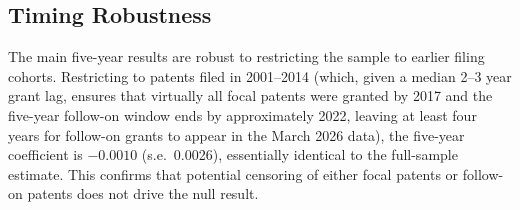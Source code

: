 \documentclass[12pt]{article}
\begin{document}
\subsection{Timing Robustness}
\label{app:timing}

The main five-year results are robust to restricting the sample to earlier filing cohorts. Restricting to patents filed in 2001--2014 (which, given a median 2--3 year grant lag, ensures that virtually all focal patents were granted by 2017 and the five-year follow-on window ends by approximately 2022, leaving at least four years for follow-on grants to appear in the March 2026 data), the five-year coefficient is $-0.0010$ (s.e.\ 0.0026), essentially identical to the full-sample estimate. This confirms that potential censoring of either focal patents or follow-on patents does not drive the null result.
\end{document}
